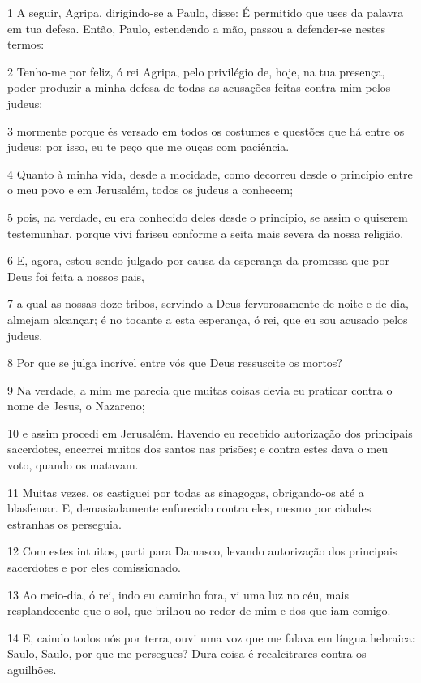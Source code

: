 \par 1 A seguir, Agripa, dirigindo-se a Paulo, disse: É permitido que uses da palavra em tua defesa. Então, Paulo, estendendo a mão, passou a defender-se nestes termos:
\par 2 Tenho-me por feliz, ó rei Agripa, pelo privilégio de, hoje, na tua presença, poder produzir a minha defesa de todas as acusações feitas contra mim pelos judeus;
\par 3 mormente porque és versado em todos os costumes e questões que há entre os judeus; por isso, eu te peço que me ouças com paciência.
\par 4 Quanto à minha vida, desde a mocidade, como decorreu desde o princípio entre o meu povo e em Jerusalém, todos os judeus a conhecem;
\par 5 pois, na verdade, eu era conhecido deles desde o princípio, se assim o quiserem testemunhar, porque vivi fariseu conforme a seita mais severa da nossa religião.
\par 6 E, agora, estou sendo julgado por causa da esperança da promessa que por Deus foi feita a nossos pais,
\par 7 a qual as nossas doze tribos, servindo a Deus fervorosamente de noite e de dia, almejam alcançar; é no tocante a esta esperança, ó rei, que eu sou acusado pelos judeus.
\par 8 Por que se julga incrível entre vós que Deus ressuscite os mortos?
\par 9 Na verdade, a mim me parecia que muitas coisas devia eu praticar contra o nome de Jesus, o Nazareno;
\par 10 e assim procedi em Jerusalém. Havendo eu recebido autorização dos principais sacerdotes, encerrei muitos dos santos nas prisões; e contra estes dava o meu voto, quando os matavam.
\par 11 Muitas vezes, os castiguei por todas as sinagogas, obrigando-os até a blasfemar. E, demasiadamente enfurecido contra eles, mesmo por cidades estranhas os perseguia.
\par 12 Com estes intuitos, parti para Damasco, levando autorização dos principais sacerdotes e por eles comissionado.
\par 13 Ao meio-dia, ó rei, indo eu caminho fora, vi uma luz no céu, mais resplandecente que o sol, que brilhou ao redor de mim e dos que iam comigo.
\par 14 E, caindo todos nós por terra, ouvi uma voz que me falava em língua hebraica: Saulo, Saulo, por que me persegues? Dura coisa é recalcitrares contra os aguilhões.
